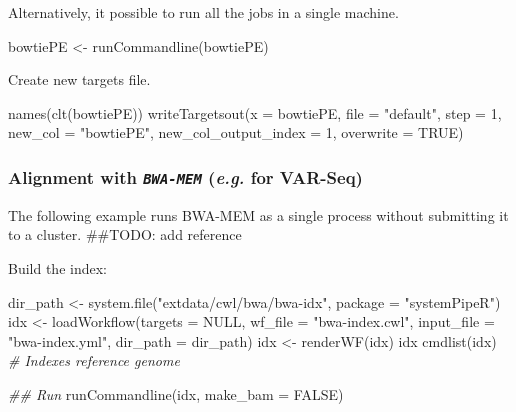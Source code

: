 \documentclass[14pt,]{article}
\newcommand{\hlnum}[1]{\textcolor[rgb]{0.816,0.125,0.439}{#1}}%
\newcommand{\hlstr}[1]{\textcolor[rgb]{0.251,0.627,0.251}{#1}}%
\newcommand{\hlcom}[1]{\textcolor[rgb]{0.502,0.502,0.502}{\textit{#1}}}%
\newcommand{\hlstd}[1]{\textcolor[rgb]{0.251,0.251,0.251}{#1}}%
\newenvironment{Shaded}{\begin{myshaded}}{\end{myshaded}}
\newcommand{\DecValTok}[1]{\hlnum{#1}}
\newcommand{\ConstantTok}[1]{\hlnum{#1}}
\newcommand{\StringTok}[1]{\hlstr{#1}}
\newcommand{\CommentTok}[1]{\hlcom{#1}}
\newcommand{\DocumentationTok}[1]{\hlcom{#1}}
\newcommand{\OtherTok}[1]{{#1}}
\newcommand{\FunctionTok}[1]{\hlstd{#1}}
\newcommand{\AttributeTok}[1]{{#1}}
\newcommand{\NormalTok}[1]{\hlstd{#1}}
\begin{document}
Alternatively, it possible to run all the jobs in a single machine.

\begin{Shaded}
\begin{Highlighting}[]
\NormalTok{bowtiePE }\OtherTok{\textless{}{-}} \FunctionTok{runCommandline}\NormalTok{(bowtiePE)}
\end{Highlighting}
\end{Shaded}

Create new targets file.

\begin{Shaded}
\begin{Highlighting}[]
\FunctionTok{names}\NormalTok{(}\FunctionTok{clt}\NormalTok{(bowtiePE))}
\FunctionTok{writeTargetsout}\NormalTok{(}\AttributeTok{x =}\NormalTok{ bowtiePE, }\AttributeTok{file =} \StringTok{"default"}\NormalTok{, }\AttributeTok{step =} \DecValTok{1}\NormalTok{, }\AttributeTok{new\_col =} \StringTok{"bowtiePE"}\NormalTok{, }\AttributeTok{new\_col\_output\_index =} \DecValTok{1}\NormalTok{, }
    \AttributeTok{overwrite =} \ConstantTok{TRUE}\NormalTok{)}
\end{Highlighting}
\end{Shaded}

\hypertarget{alignment-with-bwa-mem-e.g.-for-var-seq}{%
\subsubsection{\texorpdfstring{Alignment with \emph{\texttt{BWA-MEM}} (\emph{e.g.} for VAR-Seq)}{Alignment with BWA-MEM (e.g. for VAR-Seq)}}\label{alignment-with-bwa-mem-e.g.-for-var-seq}}

The following example runs BWA-MEM as a single process without submitting it to a cluster. \#\#TODO: add reference

Build the index:

\begin{Shaded}
\begin{Highlighting}[]
\NormalTok{dir\_path }\OtherTok{\textless{}{-}} \FunctionTok{system.file}\NormalTok{(}\StringTok{"extdata/cwl/bwa/bwa{-}idx"}\NormalTok{, }\AttributeTok{package =} \StringTok{"systemPipeR"}\NormalTok{)}
\NormalTok{idx }\OtherTok{\textless{}{-}} \FunctionTok{loadWorkflow}\NormalTok{(}\AttributeTok{targets =} \ConstantTok{NULL}\NormalTok{, }\AttributeTok{wf\_file =} \StringTok{"bwa{-}index.cwl"}\NormalTok{, }\AttributeTok{input\_file =} \StringTok{"bwa{-}index.yml"}\NormalTok{, }
    \AttributeTok{dir\_path =}\NormalTok{ dir\_path)}
\NormalTok{idx }\OtherTok{\textless{}{-}} \FunctionTok{renderWF}\NormalTok{(idx)}
\NormalTok{idx}
\FunctionTok{cmdlist}\NormalTok{(idx)  }\CommentTok{\# Indexes reference genome}

\DocumentationTok{\#\# Run}
\FunctionTok{runCommandline}\NormalTok{(idx, }\AttributeTok{make\_bam =} \ConstantTok{FALSE}\NormalTok{)}
\end{Highlighting}
\end{Shaded}
\end{document}
